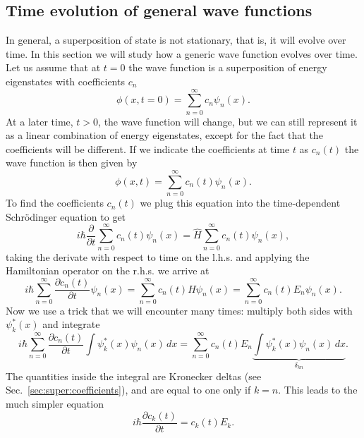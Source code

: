 \documentclass[../Main/chem331-notes.tex]{subfiles}
\begin{document}
\subsection{Time evolution of general wave functions}
In general, a superposition of state is not stationary, that is, it will evolve over time.
In this section we will study how a generic wave function evolves over time.
Let us assume that at $t = 0$ the wave function is a superposition of energy eigenstates with coefficients $c_n$
\begin{equation}
\phi(x, t = 0) = \sum_{n = 0}^\infty c_n \psi_n(x).
\end{equation}
At a later time, $t > 0$, the wave function will change, but we can still represent it as a linear combination of energy eigenstates, except for the fact that the coefficients will be different. If we indicate the coefficients at time $t$ as $c_n(t)$ the wave function is then given by
\begin{equation}
\label{eq:super:tdwavefunction}
\phi(x, t) = \sum_{n = 0}^\infty c_n(t) \psi_n(x).
\end{equation}
To find the coefficients $c_n(t)$ we plug this equation into the time-dependent Schr\"{o}dinger equation to get
\begin{equation}
i\hbar \frac{\partial }{\partial t} \sum_{n = 0}^\infty c_n(t) \psi_n(x)= \hat{H} \sum_{n = 0}^\infty c_n(t) \psi_n(x),
\end{equation}
taking the derivate with respect to time on the l.h.s. and applying the Hamiltonian operator on the r.h.s. we arrive at
\begin{equation}
i\hbar  \sum_{n = 0}^\infty \frac{\partial c_n(t)}{\partial t} \psi_n(x)= \sum_{n = 0}^\infty c_n(t)  \hat{H}\psi_n(x) = \sum_{n = 0}^\infty c_n(t)  E_n \psi_n(x).
\end{equation}
Now we use a trick that we will encounter many times: multiply both sides with $\psi^*_k(x)$ and integrate
\begin{equation}
i\hbar  \sum_{n = 0}^\infty \frac{\partial c_n(t)}{\partial t} \int \psi^*_k(x)\psi_n(x) \, dx= \sum_{n = 0}^\infty c_n(t)  E_n \underbrace{\int \psi^*_k(x)\psi_n(x)  \,  dx}_{\delta_{kn}}.
\end{equation}
The quantities inside the integral are Kronecker deltas (see Sec.~\ref{sec:super:coefficients}), and are equal to one only if $ k = n$. This leads to the much simpler equation
\begin{equation}
i\hbar  \frac{\partial c_k(t)}{\partial t} = c_k(t)  E_k.
\end{equation}
\end{document}
